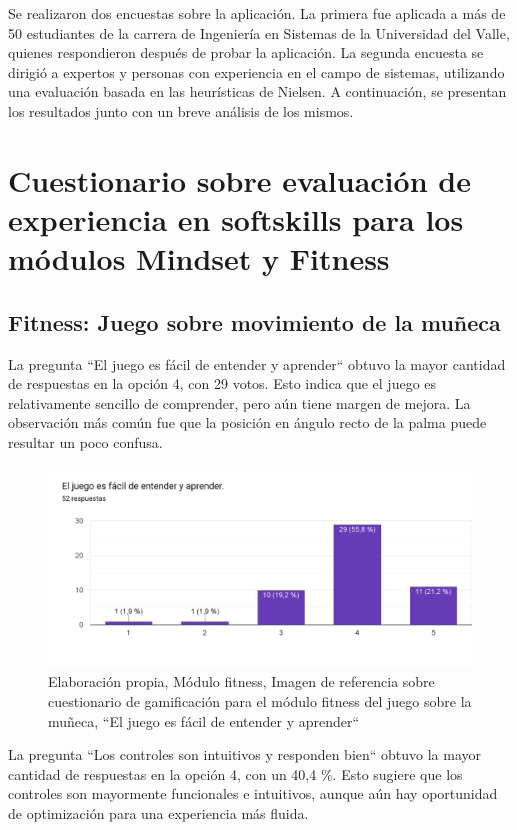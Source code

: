 
Se realizaron dos encuestas sobre la aplicación. La primera fue aplicada a más de 50 estudiantes de la carrera de Ingeniería en Sistemas de la Universidad del Valle, quienes respondieron después de probar la aplicación. La segunda encuesta se dirigió a expertos y personas con experiencia en el campo de sistemas, utilizando una evaluación basada en las heurísticas de Nielsen. A continuación, se presentan los resultados junto con un breve análisis de los mismos.
\section{Cuestionario sobre evaluación de experiencia en softskills para los módulos Mindset y Fitness}
\subsection{Fitness: Juego sobre movimiento de la muñeca}
La pregunta ``El juego es fácil de entender y aprender`` obtuvo la mayor cantidad de respuestas en la opción 4, con 29 votos. Esto indica que el juego es relativamente sencillo de comprender, pero aún tiene margen de mejora. La observación más común fue que la posición en ángulo recto de la palma puede resultar un poco confusa.

    \begin{figure}[H]
  \centering
  \includegraphics[width=0.7\linewidth]{Imagenes/fc1.png}
  \caption{Elaboración propia, Módulo fitness, Imagen de referencia sobre cuestionario  de gamificación para el módulo fitness del juego sobre la muñeca, ``El juego es fácil de entender y aprender``}
  \label{fig:cuestionario1fitness}
\end{figure}



La pregunta ``Los controles son intuitivos y responden bien`` obtuvo la mayor cantidad de respuestas en la opción 4, con un 40,4 \%. Esto sugiere que los controles son mayormente funcionales e intuitivos, aunque aún hay oportunidad de optimización para una experiencia más fluida.

